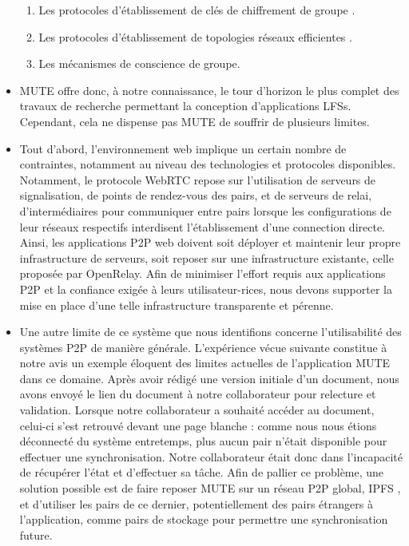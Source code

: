 \begin{itemize}
\begin{enumerate}
            \item Les protocoles d'établissement de clés de chiffrement de groupe \cite{1995-burmester-desmedt}.
            \item Les protocoles d'établissement de topologies réseaux efficientes \cite{2018-spray-nedelec}.
            \item Les mécanismes de conscience de groupe.
        \end{enumerate}
    \item \ac{MUTE} offre donc, à notre connaissance, le tour d'horizon le plus complet des travaux de recherche permettant la conception d'applications \acp{LFS}.
        Cependant, cela ne dispense pas \ac{MUTE} de souffrir de plusieurs limites.
    \item Tout d'abord, l'environnement web implique un certain nombre de contraintes, notamment au niveau des technologies et protocoles disponibles.
        Notamment, le protocole WebRTC repose sur l'utilisation de serveurs de signalisation, \ie de points de rendez-vous des pairs, et de serveurs de relai, \ie d'intermédiaires pour communiquer entre pairs lorsque les configurations de leur réseaux respectifs interdisent l'établissement d'une connection directe.
        Ainsi, les applications \ac{P2P} web doivent soit déployer et maintenir leur propre infrastructure de serveurs, soit reposer sur une infrastructure existante, \eg celle proposée par OpenRelay.
        Afin de minimiser l'effort requis aux applications \ac{P2P} et la confiance exigée à leurs utilisateur-rices, nous devons supporter la mise en place d'une telle infrastructure transparente et pérenne.
    \item Une autre limite de ce système que nous identifions concerne l'utilisabilité des systèmes \ac{P2P} de manière générale.
        L'expérience vécue suivante constitue à notre avis un exemple éloquent des limites actuelles de l'application \ac{MUTE} dans ce domaine.
        Après avoir rédigé une version initiale d'un document, nous avons envoyé le lien du document à notre collaborateur pour relecture et validation.
        Lorsque notre collaborateur a souhaité accéder au document, celui-ci s'est retrouvé devant une page blanche : comme nous nous étions déconnecté du système entretemps, \ie plus aucun pair n'était disponible pour effectuer une synchronisation.
        Notre collaborateur était donc dans l'incapacité de récupérer l'état et d'effectuer sa tâche.
        Afin de pallier ce problème, une solution possible est de faire reposer \ac{MUTE} sur un réseau \ac{P2P} global, \eg \ac{IPFS} , et d'utiliser les pairs de ce dernier, potentiellement des pairs étrangers à l'application, comme pairs de stockage pour permettre une synchronisation future.

\end{itemize}
